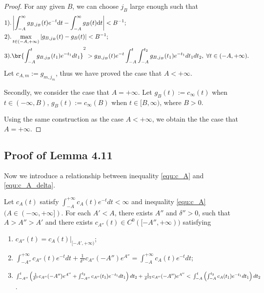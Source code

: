 \begin{proof}
  For any given $B$, we can choose $j_{B}$ large enough such that
\begin{equation}
\begin{split}
&1).\left|\int_{-A}^{\infty}g_{B,j_{B}}(t)e^{-t} \dd t-\int_{-A}^{\infty}g_{B}(t)\dd t \right|<B^{-1};
\\
&2).\max_{t\in(-A,+\infty)}|g_{B,j_{B}}(t)-g_{B}(t)|<B^{-1};
\\
&3).\br{\int_{-A}^{t}g_{B,j_{B}}(t_{1})e^{-t_{1}}dt_{1}}^{2}
>g_{B,j_{B}}(t)e^{-t}\int_{-A}^{t}
\int_{-A}^{t_{2}}g_{B,j_{B}}(t_{1})e^{-t_{1}}dt_{1}dt_{2},\; \forall t\in(-A,+\infty).
\end{split}
\end{equation}
Let $c_{A,m}:=g_{m,j_{m}}$, thus we have proved the case that
$A<+\infty$.

Secondly, we consider the case that $A=+\infty$. Let
$g_{B}(t):=c_{\infty}(t)$ when $t\in(-\infty,B)$,
$g_{B}(t):=c_{\infty}(B)$ when $t\in[B,\infty)$, where $B>0$.

Using the same construction as the case $A<+\infty$, we obtain the
the case that $A=+\infty$.
\end{proof}

\subsection{Proof of Lemma 4.11}

Now we introduce a relationship between inequality \ref{equ:c_A} and
\ref{equ:c_A_delta}.

\begin{lemma}
  Let $c_{A}(t)$ satisfy
$\int_{-A}^{+\infty}c_{A}(t)e^{-t}dt<\infty$ and inequality
\ref{equ:c_A} $(A\in(-\infty,+\infty])$. For each $A'<A$, there
exists $A''$ and $\delta''>0$, such that $A>A''>A'$ and there exists
$c_{A''}(t)\in C^{0}([-A'',+\infty))$ satisfying
\begin{enumerate}[label=\roman*)]
  \item $c_{A''}(t)=c_{A}(t)|_{[-A',+\infty)}$;
  \item $\int_{-A''}^{+\infty}c_{A''}(t)e^{-t}dt+\frac{1}{\delta''}c_{A''}(-A'')e^{A''}=
\int_{-A}^{+\infty}c_{A}(t)e^{-t}dt$;
\item $\int_{-A''}^{t}\left(\frac{1}{\delta''}c_{A''}(-A'')e^{A''}+\int_{-A''}^{t_{2}}c_{A''}(t_{1})e^{-t_{1}}dt_{1}\right)
dt_{2}+\frac{1}{{\delta''}^{2}}c_{A''}(-A'')e^{A''}<\\\int_{-A}^{t}\left(\int_{-A}^{t_{2}}c_{A}(t_{1})e^{-t_{1}}dt_{1}\right)
dt_{2}$.
\end{enumerate}
\end{lemma}

